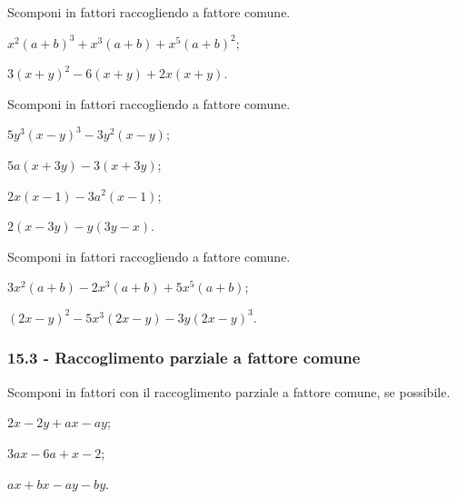 \begin{esercizio}[\Ast]
Scomponi in fattori raccogliendo a fattore comune.
\label{ese:15.14}
 \begin{multicols}{2}
 \begin{enumeratea}
 \item $x^{2}(a+b)^{3}+x^{3}(a+b)+x^{5}(a+b)^{2}$;
 \item $3(x+y)^{2}-6(x+y)+2x(x+y)$.
\end{enumeratea}
 \end{multicols}
\end{esercizio}

\begin{esercizio}
\label{ese:15.15}
Scomponi in fattori raccogliendo a fattore comune.
\begin{multicols}{2}
\begin{enumeratea}
 \item $5y^{3}(x-y)^{3}-3y^{2}(x-y)$;
 \item $5a(x+3y)-3(x+3y)$;
 \item $2x(x-1)-3a^{2}(x-1)$;
 \item $2(x-3y)-y(3y-x)$.
\end{enumeratea}
\end{multicols}
\end{esercizio}

\begin{esercizio}[\Ast]
Scomponi in fattori raccogliendo a fattore comune.
\label{ese:15.16}
\begin{multicols}{2}
 \begin{enumeratea}
 \item $3x^{2}(a+b)-2x^{3}(a+b)+5x^{5}(a+b)$;
 \item $(2x-y)^{2}-5x^{3}(2x-y)-3y(2x-y)^{3}$.
\end{enumeratea}
\end{multicols}
\end{esercizio}
\subsubsection*{15.3 - Raccoglimento parziale a fattore comune}

\begin{esercizio}[\Ast]
\label{ese:15.17}
Scomponi in fattori con il raccoglimento parziale a fattore comune, se possibile.
\begin{multicols}{3}
 \begin{enumeratea}
 \item $2x-2y+ax-ay$;
 \item $3ax-6a+x-2$;
 \item $ax+bx-ay-by$.
\end{enumeratea}
\end{multicols}
\end{esercizio}

